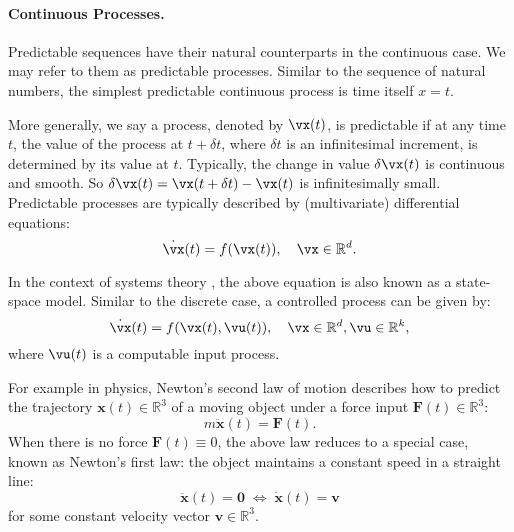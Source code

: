 \documentclass[../../book-main.tex]{subfiles}
\begin{document}
\paragraph{Continuous Processes.}
Predictable sequences have their natural counterparts in the continuous case. We may refer to them as predictable processes. Similar to the sequence of natural numbers, the simplest predictable continuous process is time itself $x=t$.

More generally, we say a process, denoted by $\vx(t)$, is predictable if at any time $t$, the value of the process at $t+\delta t$, where $\delta t$ is an infinitesimal increment, is determined by its value at $t$. Typically, the change in value $\delta \vx(t)$ is continuous and smooth. So $\delta \vx(t) = \vx(t + \delta t) - \vx(t)$ is infinitesimally small.  Predictable processes are typically described by (multivariate) differential equations:
\begin{equation}
    \dot{\vx}(t) = f(\vx(t)), \quad \vx \in \mathbb{R}^d. 
    \label{eqn:process}
\end{equation}

In the context of systems theory \cite{Cal:Des,Sastry-Nonlinear}, the above equation is also known as a state-space model. Similar to the discrete case, a controlled process can be given by:
\begin{equation}
    \dot{\vx}(t) = f(\vx(t), \vu(t) ), \quad \vx \in \mathbb{R}^d, \vu \in \mathbb{R}^k,
    \label{eqn:process-controlled}
\end{equation}
where $\vu(t)$ is a computable input process. 

\begin{example}
    For example in physics, Newton's second law of motion describes how to predict the trajectory $\boldsymbol{x}(t) \in \mathbb{R}^3$ of a moving object under a force input $\boldsymbol{F}(t) \in \mathbb{R}^3$:
\begin{equation}
    m\ddot{\boldsymbol{x}}(t) = \boldsymbol{F}(t).
\end{equation}
When there is no force $\boldsymbol{F}(t) \equiv 0$, the above law reduces to a  special case, known as Newton's first law: the object maintains a constant speed in a straight line:
\begin{equation}
   \ddot{\boldsymbol{x}}(t) = \boldsymbol{0} \; \Leftrightarrow \; \dot{\boldsymbol{x}}(t) = \boldsymbol{v}
\end{equation}
for some constant velocity vector $\boldsymbol{v} \in \mathbb{R}^3$.
\end{example}
\end{document}
